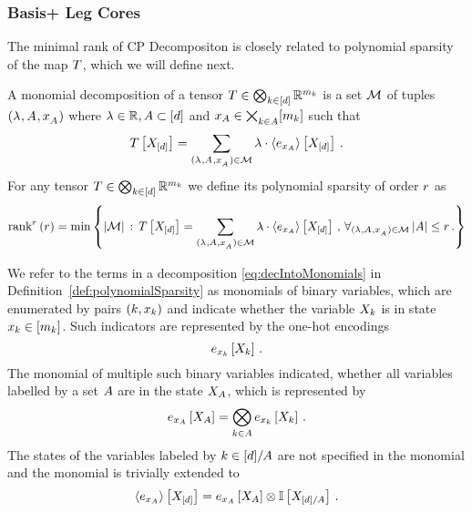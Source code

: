 \subsubsection{Basis+ Leg Cores}

The minimal rank of CP Decompositon is closely related to polynomial sparsity of the map $T$, which we will define next.

\begin{definition}\label{def:polynomialSparsity}
	A monomial decomposition of a tensor $T\in\bigotimes_{k\in[d]} \mathbb{R}^{m_{k}}$ is a set $\mathcal{M}$ of tuples $(\lambda^{}, A_{}, x_{A_{}}^{})$ where $\lambda\in\mathbb{R}, A\subset[d]$ and $x_{A}\in\bigtimes_{k\in A} [m_{k}]$ such that
	\begin{align}\label{eq:decIntoMonomials}
		T\left[X_{[d]}\right] = \sum_{(\lambda^{}, A_{}, x_{A_{}}^{})\in\mathcal{M}} \lambda \cdot \left\langle e_{x_{A}}\right\rangle \left[ X_{[d]} \right] \, .
	\end{align}
	For any tensor $T\in\bigotimes_{k\in[d]} \mathbb{R}^{m_{k}}$ we define its polynomial sparsity of order $r$ as
	\begin{align*}
		\mathrm{rank}^{r}\left(r\right) =
		 \min \left\{ \left|\mathcal{M}\right| \, : \, 
		 	T\left[X_{[d]}\right] = \sum_{(\lambda^{}, A_{}, x_{A_{}}^{})\in\mathcal{M}} \lambda \cdot \left\langle e_{x_{A}}\right\rangle \left[ X_{[d]} \right] \, , \, \forall_{(\lambda^{}, A_{}, x_{A_{}}^{})\in\mathcal{M}} \left|A\right| \leq r \, . 
		 \right\}
	\end{align*}
\end{definition}


We refer to the terms in a decomposition \eqref{eq:decIntoMonomials} in Definition~\ref{def:polynomialSparsity} as monomials of binary variables, which are enumerated by pairs $(k,x_{k})$ and indicate whether the variable $X_{k}$ is in state $x_{k}\in[m_{k}]$.
Such indicators are represented by the one-hot encodings
	\[ e_{x_{k}}\left[X_{k}\right] \, . \]
The monomial of multiple such binary variables indicated, whether all variables labelled by a set $A$ are in the state $X_{A}$, which is represented by
	\[ e_{x_{A}}\left[X_{A}\right] = \bigotimes_{k\in A} e_{x_{k}}\left[X_{k}\right]  \, . \]
The states of the variables labeled by $k\in[d]/A$ are not specified in the monomial and the monomial is trivially extended to
	\[ \left\langle e_{x_{A}}\right\rangle \left[ X_{[d]} \right]  = e_{x_{A}}\left[X_{A}\right] \otimes \mathbb{I}\left[X_{[d]/A}\right] \, .   \]



